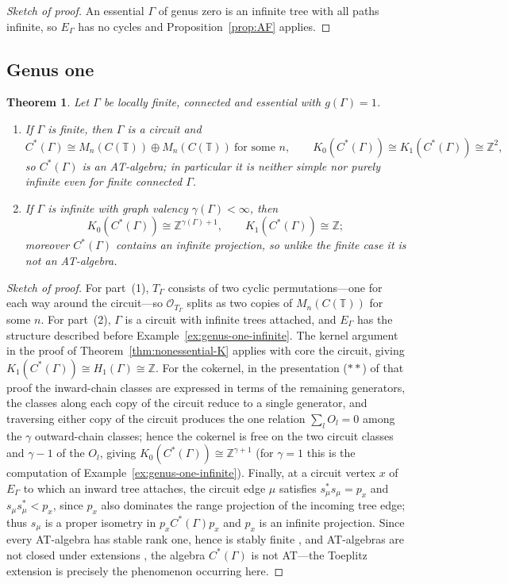 \documentclass[12pt,reqno]{amsart}
\theoremstyle{plain}
\newtheorem{theorem}{Theorem}[section]
\theoremstyle{definition}
\newcommand{\Z}{\mathbb{Z}}
\newcommand{\T}{\mathbb{T}}
\newcommand{\Ot}{\mathcal{O}}
\begin{document}
\begin{proof}[Sketch of proof]
An essential $\Gamma$ of genus zero is an infinite tree with all paths infinite, so
$E_\Gamma$ has no cycles and Proposition~\ref{prop:AF} applies.
\end{proof}

\subsection*{Genus one}

\begin{theorem}\label{thm:genus1}
Let $\Gamma$ be locally finite, connected and essential with $g(\Gamma)=1$.
\begin{enumerate}
\item If $\Gamma$ is finite, then $\Gamma$ is a circuit and
\[
C^*(\Gamma)\cong M_n(C(\T))\oplus M_n(C(\T))\ \text{for some $n$},\qquad K_0(C^*(\Gamma))\cong K_1(C^*(\Gamma))\cong\Z^{2},
\]
so $C^*(\Gamma)$ is an AT-algebra; in particular it is neither simple nor purely infinite even for
finite connected $\Gamma$.
\item If $\Gamma$ is infinite with graph valency $\gamma(\Gamma)<\infty$, then
\[
K_0(C^*(\Gamma))\cong\Z^{\gamma(\Gamma)+1},\qquad K_1(C^*(\Gamma))\cong\Z;
\]
moreover $C^*(\Gamma)$
contains an infinite projection, so unlike the finite case it is not an AT-algebra.
\end{enumerate}
\end{theorem}

\begin{proof}[Sketch of proof]
For part~(1), $T_\Gamma$ consists
of two cyclic permutations---one for
each way around the circuit---so $\Ot_{T_\Gamma}$ splits as two copies of $M_n(C(\T))$ for some
$n$. For part~(2), $\Gamma$ is a circuit with infinite trees attached, and $E_\Gamma$ has the
structure described before Example~\ref{ex:genus-one-infinite}. The kernel argument in the proof of
Theorem~\ref{thm:nonessential-K} applies with core the circuit, giving
$K_1(C^*(\Gamma))\cong H_1(\Gamma)\cong\Z$. For the cokernel, in the presentation ($**$) of that
proof the inward-chain classes are expressed in terms of the remaining generators, the classes
along each copy of the circuit reduce to a single generator, and traversing either copy of the
circuit produces the one relation $\sum_{l}O_l=0$ among the $\gamma$ outward-chain classes; hence
the cokernel is free on the two circuit classes and $\gamma-1$ of the $O_l$, giving
$K_0(C^*(\Gamma))\cong\Z^{\gamma+1}$ \textup(for $\gamma=1$ this is the computation of
Example~\ref{ex:genus-one-infinite}\textup). Finally, at a circuit vertex $x$ of $E_\Gamma$ to which an inward tree attaches, the
circuit edge $\mu$ satisfies $s_\mu^*s_\mu=p_x$ and $s_\mu s_\mu^*<p_x$, since $p_x$ also
dominates the range projection of the incoming tree edge; thus $s_\mu$ is a proper isometry in
$p_xC^*(\Gamma)p_x$ and $p_x$ is an infinite projection. Since every AT-algebra has stable rank
one, hence is stably finite \cite[Proposition~3.2.4]{Rordam}, and AT-algebras are not closed under
extensions \cite[Proposition~3.2.5]{Rordam}, the algebra $C^*(\Gamma)$ is not AT---the Toeplitz
extension is precisely the phenomenon occurring here.
\end{proof}
\end{document}
